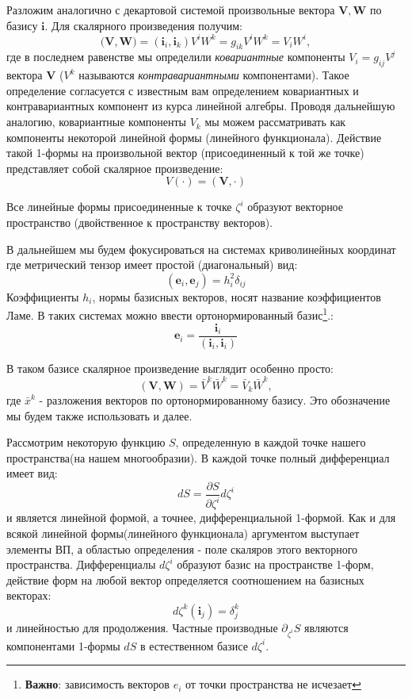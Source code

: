 \documentclass{article}
\begin{document}
 	Разложим аналогично с декартовой системой произвольные вектора $\mathbf{V,W}$ по базису $\mathbf{i}$. Для скалярного произведения получим:
 	$$(\mathbf{V,W)} = (\mathbf{i}_i, \mathbf{i}_k) V^i W^k = g_{ik} V^i W^k = V_i W^i,$$
 	где в последнем равенстве мы определили \textit{ковариантные} компоненты $V_i = g_{ij} V^j$ вектора $\mathbf{V}$ ($V^k$ называются \textit{контравариантными} компонентами). Такое определение согласуется с известным вам определением ковариантных и контравариантных компонент из курса линейной алгебры. Проводя дальнейшую аналогию, ковариантные компоненты $V_k$ мы можем рассматривать как  компоненты некоторой линейной формы (линейного функционала). Действие такой 1-формы на произвольной вектор (присоединенный к той же точке) представляет собой скалярное произведение:
 	$${V}(\cdot) = (\mathbf{V}, \cdot)$$
 	
 	Все линейные формы присоединенные к точке $\zeta^i$ образуют векторное пространство (двойственное к пространству векторов).   
 	
 	В дальнейшем мы будем фокусироваться на системах криволинейных координат где метрический тензор имеет простой (диагональный) вид:
 	$$(\mathbf{e}_i, \mathbf{e}_j) = h^2_i \delta_{ij}$$ 
 	Коэффициенты $h_i$, нормы базисных векторов, носят название коэффициентов Ламе.
 	В таких системах можно ввести ортонормированный базис\footnote{\textbf{Важно}: зависимость векторов $e_i$ от точки пространства не исчезает}.:
 	$$ \mathbf{e}_i = \frac{\mathbf{i}_i}{(\mathbf{i}_i,\mathbf{i}_i)}$$
 	
 	
 	В таком базисе скалярное произведение выглядит особенно просто:
 	$$(\mathbf{V}, \mathbf{W}) = \bar{V}^k \bar{W}^k = \bar{V}_k \bar {W}^k,$$
 	где $\bar{x}^k$ - разложения векторов по ортонормированному базису. Это обозначение мы будем также использовать и далее.
 	
 	Рассмотрим некоторую функцию $S$, определенную в каждой точке нашего пространства(на нашем многообразии). В каждой точке полный дифференциал имеет вид:
 	$$dS = \frac {\partial S}{\partial \zeta^i} d \zeta^i$$
 	и является линейной формой, а точнее, дифференциальной 1-формой. Как и для всякой линейной формы(линейного функционала) аргументом выступает элементы ВП, а областью определения - поле скаляров этого векторного пространства.
 	Дифференциалы $d \zeta^i$ образуют базис на пространстве 1-форм, действие форм на любой вектор определяется соотношением на базисных векторах:
 	$$d \zeta^k (\mathbf{i}_j) = \delta^k_j$$ 
 	и линейностью для продолжения. Частные производные $ \partial_{\zeta^i} S$ являются компонентами 1-формы $dS$ в естественном базисе $d \zeta^i$.
 	
\end{document}
